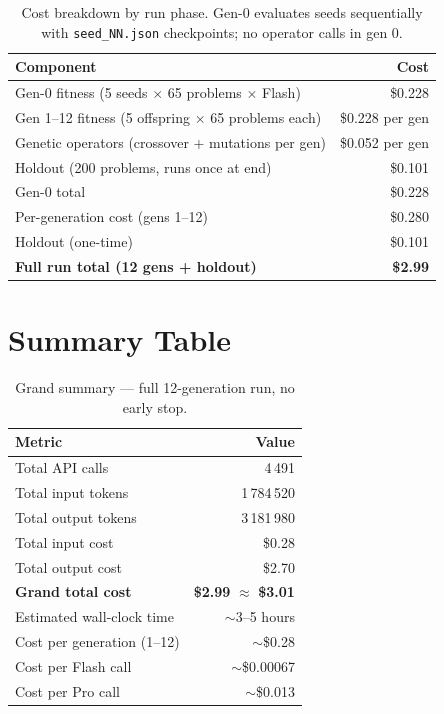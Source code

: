 \documentclass[11pt,a4paper]{report}
\begin{document}
\begin{table}[h]
\centering
\begin{tabular}{@{}lr@{}}
\toprule
\textbf{Component} & {\textbf{Cost}} \\
\midrule
Gen-0 fitness (5 seeds $\times$ 65 problems $\times$ Flash)    & \$0.228 \\
Gen 1--12 fitness (5 offspring $\times$ 65 problems each)       & \$0.228 per gen \\
Genetic operators (crossover + mutations per gen)               & \$0.052 per gen \\
Holdout (200 problems, runs once at end)                        & \$0.101 \\
\midrule
Gen-0 total                                                     & \$0.228 \\
Per-generation cost (gens 1--12)                                & \$0.280 \\
Holdout (one-time)                                              & \$0.101 \\
\midrule
\textbf{Full run total (12 gens + holdout)}                     & \textbf{\$2.99} \\
\bottomrule
\end{tabular}
\caption{Cost breakdown by run phase.  Gen-0 evaluates seeds sequentially with
         \texttt{seed\_NN.json} checkpoints; no operator calls in gen 0.}
\end{table}

\section{Summary Table}

\begin{table}[h]
\centering
\renewcommand{\arraystretch}{1.2}
\begin{tabular}{@{}lr@{}}
\toprule
\textbf{Metric} & \textbf{Value} \\
\midrule
Total API calls              & 4\,491 \\
Total input tokens           & 1\,784\,520 \\
Total output tokens          & 3\,181\,980 \\
Total input cost             & \$0.28 \\
Total output cost            & \$2.70 \\
\midrule
\textbf{Grand total cost}    & \textbf{\$2.99} $\approx$ \textbf{\$3.01} \\
\midrule
Estimated wall-clock time    & $\sim$3--5 hours \\
Cost per generation (1--12)  & $\sim$\$0.28 \\
Cost per Flash call          & $\sim$\$0.00067 \\
Cost per Pro call            & $\sim$\$0.013 \\
\bottomrule
\end{tabular}
\caption{Grand summary --- full 12-generation run, no early stop.}
\label{tab:summary}
\end{table}
\end{document}
